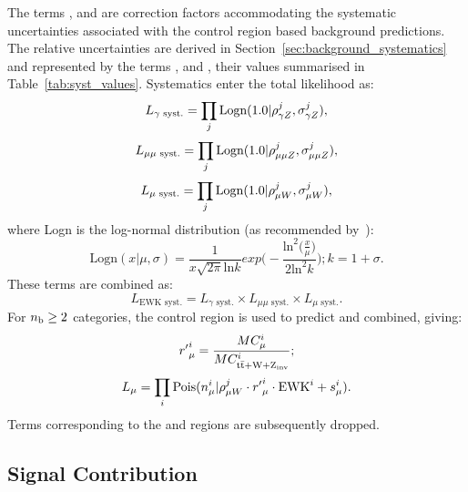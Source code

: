 The terms \rhopz, \rhommz and \rhomw are correction factors accommodating the
systematic uncertainties associated with the control region based background 
predictions. The relative uncertainties are derived in
Section~\ref{sec:background_systematics} and represented by the terms \sigmapz, \sigmammz
and \sigmamw, their 
values summarised in Table~\ref{tab:syst_values}. Systematics enter the total
likelihood as:
% 
\begin{equation}
L_{\gamma\text{ syst.}} = \prod_j \text{Logn}(1.0 | \rho^j_{\gamma Z}, \sigma^j_{\gamma Z}),
\end{equation}
\begin{equation}
L_{\mu\mu\text{ syst.}} = \prod_j \text{Logn}(1.0 | \rho^j_{\mu\mu Z}, \sigma^j_{\mu\mu Z}),
\end{equation}
\begin{equation}
L_{\mu\text{ syst.}} = \prod_j \text{Logn}(1.0 | \rho^j_{\mu W}, \sigma^j_{\mu W}),
\end{equation}
% 
where Logn is the log-normal distribution (as recommended by~\cite{cousins-log-normal}):
% 
\begin{equation}
\text{Logn}(x|\mu, \sigma) = \frac{1}{x\sqrt{2\pi}\text{ln}k} exp \Bigg(-\frac{\text{ln}^2 \big(\frac{x}{\mu}\big)}{2\text{ln}^2k}\Bigg); \xspace k = 1+\sigma .
\end{equation}
% 
These terms are combined as:
% 
\begin{equation}
L_{\text{EWK syst.}} = L_{\gamma\text{ syst.}} \times L_{\mu\mu\text{ syst.}} \times L_{\mu\text{ syst.}}.
\end{equation}
% 
For $n_{\text{b}} \geq 2$ categories, the \mj control region is used to predict \zinv and
\ttw combined, giving:
% 
\begin{equation}
{r'}^i_{\mu} = \frac{MC_{\mu}^i}{MC^i_{\rm{t}\bar{\rm{t}} + W + \text{Z}_{\text{inv}}}};
\end{equation}
% 
\begin{equation}
L_{\mu} = \prod_i \text{Pois}(n_{\mu}^i | \rho^j_{\mu W} \cdot {r'}_{\mu}^i \cdot \text{EWK}^i + s_{\mu}^i).
\end{equation}
% 
Terms corresponding to the \mmj and \gj regions are subsequently dropped.

\subsection{Signal Contribution}

